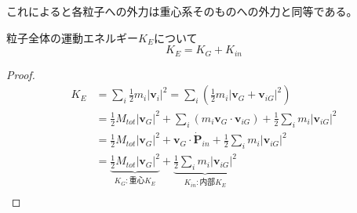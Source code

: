 \documentclass[dvipdfmx,uplatex]{jsarticle}
\begin{document}
これによると各粒子への外力は重心系そのものへの外力と同等である。

\begin{theo}
粒子全体の運動エネルギー$K_E$について \\
$$
K_E = K_G + K_{in}
$$
\end{theo}

\begin{proof}
  \begin{align*}
    K_E &= \sum_i \frac{1}{2} m_i |\bm{v}_i|^2
    = \sum_i \left( \frac{1}{2} m_i | \bm{v}_G + \bm{v}_{iG} |^2 \right)\\
    &= \frac{1}{2} M_{tot} |\bm{v}_G|^2 + \sum_i ( m_i \bm{v}_G \cdot \bm{v}_{iG} ) + \frac{1}{2} \sum_i m_i |\bm{v}_{iG}|^2 \\
    &= \frac{1}{2} M_{tot} |\bm{v}_G|^2 + \bm{v}_G \cdot \dot{\bm{P}}_{in} + \frac{1}{2} \sum_i m_i |\bm{v}_{iG}|^2 \\
    &= \underbrace{\frac{1}{2} M_{tot} |\bm{v}_G|^2}_{K_G:重心K_E} + \underbrace{\frac{1}{2} \sum_i m_i |\bm{v}_{iG}|^2}_{K_{in}:内部K_E} \\
  \end{align*}
\end{proof}
\end{document}
